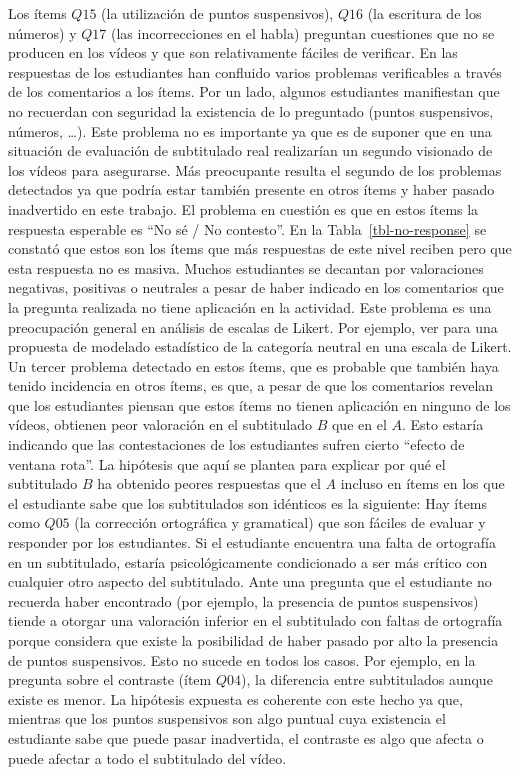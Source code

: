 \documentclass[
  12pt,
  a4paper,
  extrafontsizes,
  onecolumn,
  openright,
  table]{memoir}
\begin{document}
Los ítems \(Q15\) (la utilización de puntos suspensivos), \(Q16\) (la
escritura de los números) y \(Q17\) (las incorrecciones en el habla)
preguntan cuestiones que no se producen en los vídeos y que son
relativamente fáciles de verificar. En las respuestas de los estudiantes
han confluido varios problemas verificables a través de los comentarios
a los ítems. Por un lado, algunos estudiantes manifiestan que no
recuerdan con seguridad la existencia de lo preguntado (puntos
suspensivos, números, \ldots). Este problema no es importante ya que es
de suponer que en una situación de evaluación de subtitulado real
realizarían un segundo visionado de los vídeos para asegurarse. Más
preocupante resulta el segundo de los problemas detectados ya que podría
estar también presente en otros ítems y haber pasado inadvertido en este
trabajo. El problema en cuestión es que en estos ítems la respuesta
esperable es \enquote{No sé / No contesto}. En la
Tabla~\ref{tbl-no-response} se constató que estos son los ítems que más
respuestas de este nivel reciben pero que esta respuesta no es masiva.
Muchos estudiantes se decantan por valoraciones negativas, positivas o
neutrales a pesar de haber indicado en los comentarios que la pregunta
realizada no tiene aplicación en la actividad. Este problema es una
preocupación general en análisis de escalas de Likert. Por ejemplo, ver
\textcite{tutz2020} para una propuesta de modelado estadístico de la
categoría neutral en una escala de Likert. Un tercer problema detectado
en estos ítems, que es probable que también haya tenido incidencia en
otros ítems, es que, a pesar de que los comentarios revelan que los
estudiantes piensan que estos ítems no tienen aplicación en ninguno de
los vídeos, obtienen peor valoración en el subtitulado \(B\) que en el
\(A\). Esto estaría indicando que las contestaciones de los estudiantes
sufren cierto \enquote{efecto de ventana rota}. La hipótesis que aquí se
plantea para explicar por qué el subtitulado \(B\) ha obtenido peores
respuestas que el \(A\) incluso en ítems en los que el estudiante sabe
que los subtitulados son idénticos es la siguiente: Hay ítems como
\(Q05\) (la corrección ortográfica y gramatical) que son fáciles de
evaluar y responder por los estudiantes. Si el estudiante encuentra una
falta de ortografía en un subtitulado, estaría psicológicamente
condicionado a ser más crítico con cualquier otro aspecto del
subtitulado. Ante una pregunta que el estudiante no recuerda haber
encontrado (por ejemplo, la presencia de puntos suspensivos) tiende a
otorgar una valoración inferior en el subtitulado con faltas de
ortografía porque considera que existe la posibilidad de haber pasado
por alto la presencia de puntos suspensivos. Esto no sucede en todos los
casos. Por ejemplo, en la pregunta sobre el contraste (ítem \(Q04\)), la
diferencia entre subtitulados aunque existe es menor. La hipótesis
expuesta es coherente con este hecho ya que, mientras que los puntos
suspensivos son algo puntual cuya existencia el estudiante sabe que
puede pasar inadvertida, el contraste es algo que afecta o puede afectar
a todo el subtitulado del vídeo.
\end{document}
